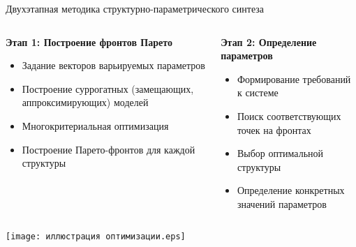 \begin{frame}{Двухэтапная методика структурно-параметрического синтеза}
	\centering
	\vspace{-0.5cm}
	\begin{columns}[T]
		\begin{column}{0.48\textwidth}
			\begin{block}{\scriptsize \textbf{Этап 1: Построение фронтов Парето}}
				\scriptsize
				\begin{itemize}
					\item Задание векторов варьируемых параметров
					\item Построение суррогатных (замещающих, аппроксимирующих) моделей
					\item Многокритериальная оптимизация
					\item Построение Парето-фронтов для каждой структуры
				\end{itemize}
			\end{block}
		\end{column}

		\begin{column}{0.48\textwidth}
			\begin{block}{\scriptsize \textbf{Этап 2: Определение параметров}}
				\scriptsize
				\begin{itemize}
					\item Формирование требований к системе
					\item Поиск соответствующих точек на фронтах
					\item Выбор оптимальной структуры
					\item Определение конкретных значений параметров
				\end{itemize}
			\end{block}
		\end{column}
	\end{columns}
	\centering
	\texttt{[image: иллюстрация оптимизации.eps]}
\end{frame}

